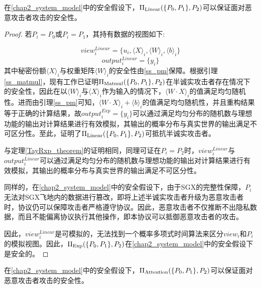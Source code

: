 \begin{theorem}
	\label{Linear_theorem}
	在\ref{chap2_system_model}中的安全假设下，$\Pi_{\rm Linear}(\{P_0, P_1\}, P_2)$可以保证面对恶意攻击者攻击的安全性。
\end{theorem}

\begin{proof}
	若$P_i=P_0$或$P_i=P_1$，其持有数据的视图如下:
	
	$$view_i^{Linear}=\{u_i, \langle X\rangle_i,\langle W\rangle_i, \langle b\rangle_i\}$$
	$$output_i^{Linear
	}=\{y_i\}$$
	其中秘密份额$\langle X\rangle_i$与权重矩阵$\langle W\rangle_i$的安全性由\ref{ss_pm}保障。根据引理\ref{ss_matmul}，现有工作已证明$\Pi_{\rm Matmul}(\{P_0, P_1\}, P_2)$在半诚实攻击者存在情况下的安全性，因此在以$\langle W\rangle_i$与$\langle X\rangle_i$作为输入的情况下，$\langle W\cdot X\rangle_i$的值满足均匀随机性。进而由引理\ref{ss_pm}可知，$\langle W\cdot X\rangle_i + \langle b\rangle_i$的值满足均匀随机性，并且重构结果等于正确的计算结果，故$output_i^{Exp}=\{y_i\}$可以通过满足均匀分布的随机数与理想功能的输出对计算结果进行有效模拟，其输出的概率分布与真实世界的输出满足不可区分性。至此，证明了$\Pi_{\rm Linear}(\{P_0, P_1\}, P_2)$可抵抗半诚实攻击者。
	
	与定理\ref{TayRxp_theorem}的证明相同，同理可证在$P_i=P_2$时，$view_i^{Linear}$与$output_i^{Linear}$可以通过满足均匀分布的随机数与理想功能的输出对计算结果进行有效模拟，其输出的概率分布与真实世界的输出满足不可区分性。
	
	同样的，在\ref{chap2_system_model}中的安全假设下，由于SGX的完整性保障\cite{SGX_Explained}，$P_i$无法对SGX飞地内的数据进行篡改，即将上述半诚实攻击者升级为恶意攻击者时，协议仍可以保障攻击者严格遵守协议。因此，恶意攻击者不仅推断不出隐私数据，而且不能偏离协议执行其他操作，即本协议可以抵御恶意攻击者的攻击。
	
	因此，$view_i^{Linear}$是可模拟的，无法找到一个概率多项式时间算法来区分$view_i$和$P_i$的模拟视图。因此，$\Pi_{\rm Exp}(\{P_0, P_1\}, P_2)$在\ref{chap2_system_model}中的安全假设下是安全的。

\end{proof}

\begin{theorem}
	\label{Attention_theorem}
	在\ref{chap2_system_model}中的安全假设下，$\Pi_{\rm Attention}(\{P_0, P_1\}, P_2)$可以保证面对恶意攻击者攻击的安全性。
\end{theorem}

